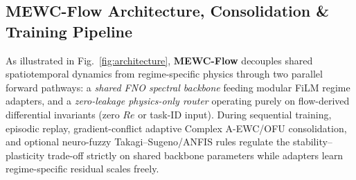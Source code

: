 \documentclass[11pt,a4paper]{article}
\begin{document}
\subsection{MEWC-Flow Architecture, Consolidation \& Training Pipeline}

As illustrated in Fig.~\ref{fig:architecture}, \textbf{MEWC-Flow} decouples shared spatiotemporal dynamics from regime-specific physics through two parallel forward pathways: a \emph{shared FNO spectral backbone} feeding modular FiLM regime adapters, and a \emph{zero-leakage physics-only router} operating purely on flow-derived differential invariants (zero $Re$ or task-ID input). During sequential training, episodic replay, gradient-conflict adaptive Complex A-EWC/OFU consolidation, and optional neuro-fuzzy Takagi--Sugeno/ANFIS rules regulate the stability--plasticity trade-off strictly on shared backbone parameters while adapters learn regime-specific residual scales freely.
\end{document}
